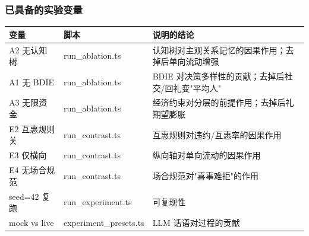 \documentclass[AutoFakeBold,AutoFakeSlant]{beamer}
\begin{document}
\begin{frame}
    \frametitle{已具备的实验变量}
    \tiny
    \begin{tabularx}{\textwidth}{|l|l|X|}
        \toprule
        \textbf{变量} & \textbf{脚本} & \textbf{说明的结论} \\
        \midrule
        A2 无认知树 & run\_ablation.ts & 认知树对主观关系记忆的因果作用；去掉后单向流动增强 \\
        \midrule
        A1 无 BDIE & run\_ablation.ts & BDIE 对决策多样性的贡献；去掉后社交/回礼变"平均人" \\
        \midrule
        A3 无限资金 & run\_ablation.ts & 经济约束对分层的前提作用；去掉后礼期望膨胀 \\
        \midrule
        E2 互惠规则关 & run\_contrast.ts & 互惠规则对违约/互惠率的因果作用 \\
        \midrule
        E3 仅横向 & run\_contrast.ts & 纵向轴对单向流动的因果作用 \\
        \midrule
        E4 无场合规范 & run\_contrast.ts & 场合规范对"喜事难拒"的作用 \\
        \midrule
        seed=42 复跑 & run\_experiment.ts & 可复现性 \\
        \midrule
        mock vs live & experiment\_presets.ts & LLM 话语对过程的贡献 \\
        \bottomrule
    \end{tabularx}
\end{frame}
\end{document}
